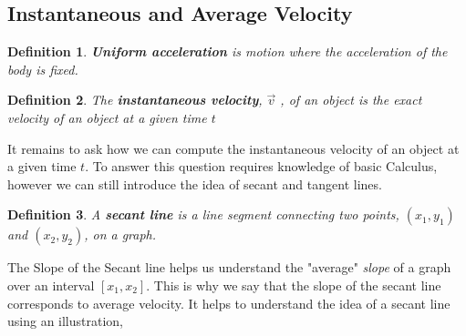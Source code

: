 \documentclass[12pt]{article}
\theoremstyle{break}
\newtheorem{defn}{Definition}[subsection]
\begin{document}
\subsection{Instantaneous and Average Velocity}
\begin{defn}
\textbf{Uniform acceleration} is motion where the acceleration of the body is fixed.
\end{defn}

\begin{defn}
The \textbf{instantaneous velocity}, $\vec v$ , of an object is the \emph{exact} velocity of an object at a given time $t$
\end{defn}

It remains to ask how we can compute the instantaneous velocity of an object at a given time $t$. To answer this question requires knowledge of basic Calculus, however we can still introduce the idea of secant and tangent lines.
\begin{defn}
A \textbf{secant line} is a line segment connecting two points, $(x_1,y_1)$ and $(x_2,y_2)$, on a graph. 
\end{defn}
The Slope of the Secant line helps us understand the "average" \emph{slope} of a graph over an interval $[x_1,x_2]$. This is why we say that the slope of the secant line corresponds to average velocity. It helps to understand the idea of a secant line using an illustration,

\begin{center}
\end{center}
\end{document}
